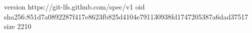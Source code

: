 version https://git-lfs.github.com/spec/v1
oid sha256:851d7a0892287f417e8623fb825d4104e791130938fd1747205387a6dad37517
size 2210
